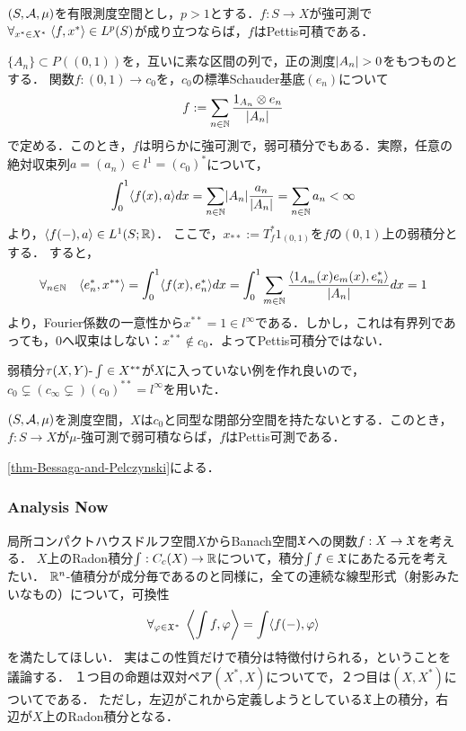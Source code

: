 \documentclass[uplatex,dvipdfmx]{jsreport}
\begin{document}
\begin{corollary}
    $(S,\mathcal{A},\mu)$を有限測度空間とし，$p>1$とする．$f:S\to X$が強可測で$\forall_{x^*\in X^*}\;\langle f,x^*\rangle\in L^p(S)$が成り立つならば，$f$はPettis可積である．
\end{corollary}

\begin{example}[弱可積であるがPettis可積分でない例]
    $\{A_n\}\subset P((0,1))$を，互いに素な区間の列で，正の測度$\lvert A_n\rvert>0$をもつものとする．
    関数$f:(0,1)\to c_0$を，$c_0$の標準Schauder基底$(e_n)$について
    \[f:=\sum_{n\in\mathbb{N}}\frac{1_{A_n}\otimes e_n}{\lvert A_n\rvert}\]
    で定める．このとき，$f$は明らかに強可測で，弱可積分でもある．実際，任意の絶対収束列$a=(a_n)\in l^1=(c_0)^*$について，
    \[\int^1_0\langle f(x),a\rangle dx=\sum_{n\in\mathbb{N}}\lvert A_n\rvert\frac{a_n}{\lvert A_n\rvert}=\sum_{n\in\mathbb{N}}a_n<\infty\]
    より，$\langle f(-),a\rangle\in L^1(S;\mathbb{R})$．
    ここで，$x_{**}:=T_f^*1_{(0,1)}$を$f$の$(0,1)$上の弱積分とする．
    すると，
    \[\forall_{n\in\mathbb{N}}\quad\langle e_n^*,x^{**}\rangle=\int^1_0\langle f(x),e_n^*\rangle dx=\int^1_0\sum_{m\in\mathbb{N}}\frac{\langle1_{A_m}(x)e_m(x),e_n^*\rangle}{\lvert A_n\rvert}dx=1\]
    より，Fourier係数の一意性から$x^{**}=1\in l^\infty$である．しかし，これは有界列であっても，$0$へ収束はしない：$x^{**}\notin c_0$．よってPettis可積分ではない．
\end{example}
\begin{remarks}
    弱積分$\tau(X,Y)\text{-}\int\in X^{**}$が$X$に入っていない例を作れ良いので，$c_0\subsetneq(c_\infty\subsetneq)(c_0)^{**}=l^\infty$を用いた．
\end{remarks}

\begin{proposition}
    $(S,\mathcal{A},\mu)$を測度空間，$X$は$c_0$と同型な閉部分空間を持たないとする．このとき，$f:S\to X$が$\mu$-強可測で弱可積ならば，$f$はPettis可測である．
\end{proposition}
\begin{Proof}
    \ref{thm-Bessaga-and-Pelczynski}による．
\end{Proof}

\subsubsection{Analysis Now}

\begin{tcolorbox}[colframe=ForestGreen, colback=ForestGreen!10!white,breakable,colbacktitle=ForestGreen!40!white,coltitle=black,fonttitle=\bfseries\sffamily,
    title=Pettis積分]
    局所コンパクトハウスドルフ空間$X$からBanach空間$\mathfrak{X}$への関数$f:X\to\mathfrak{X}$を考える．
    $X$上のRadon積分$\int:C_c(X)\to\mathbb{R}$について，積分$\int f\in\mathfrak{X}$にあたる元を考えたい．
    $\mathbb{R}^n$-値積分が成分毎であるのと同様に，全ての連続な線型形式（射影みたいなもの）について，可換性
    \[\forall_{\varphi\in\mathfrak{X}^*}\;\left\langle\int f,\varphi\right\rangle=\int\langle f(-),\varphi\rangle\]
    を満たしてほしい．
    実はこの性質だけで積分は特徴付けられる，ということを議論する．
    １つ目の命題は双対ペア$(X^*,X)$についてで，２つ目は$(X,X^*)$についてである．
    ただし，左辺がこれから定義しようとしている$\mathfrak{X}$上の積分，右辺が$X$上のRadon積分となる．
\end{tcolorbox}
\end{document}

